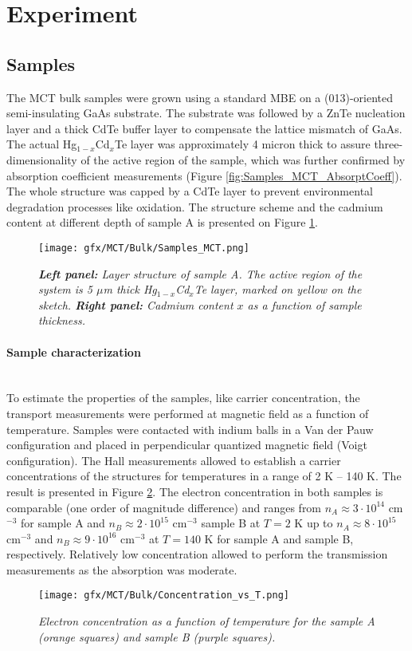 \documentclass[titlepage,a4paper]{book}
\newcommand{\wciecie}{\quad\phantom{v}}
\newcommand{\myparagraph}[1]{\paragraph{#1}\mbox{}\\}
\begin{document}
\section{Experiment}
\subsection{Samples}
\wciecie
The MCT bulk samples were grown using a standard MBE on a (013)-oriented semi-insulating GaAs substrate. The substrate was followed by a ZnTe nucleation layer and a thick CdTe buffer layer to compensate the lattice mismatch of GaAs. The actual Hg$_{1-x}$Cd$_x$Te layer was approximately 4 micron thick to assure three-dimensionality of the active region of the sample, which was further confirmed by absorption coefficient measurements (Figure \ref{fig:Samples_MCT_AbsorptCoeff}). The whole structure was capped by a CdTe layer to prevent environmental degradation processes like oxidation. The structure scheme and the cadmium content at different depth of sample A is presented on Figure \ref{fig:Samples_MCT}. 

\begin{figure}[ht]
	\centering
	\texttt{[image: gfx/MCT/Bulk/Samples\_MCT.png]}
	\vspace{-10pt}
	\caption{\textit{\textbf{Left panel:} Layer structure of sample A. The active region of the system is 5 $\mu$m thick Hg$_{1-x}$Cd$_x$Te layer, marked on yellow on the sketch. \textbf{Right panel:} Cadmium content $x$ as a function of sample thickness.}}
	\label{fig:Samples_MCT}
\end{figure} 

\myparagraph{Sample characterization}
\wciecie
To estimate the properties of the samples, like carrier concentration, the transport measurements were performed at magnetic field as a function of temperature. Samples were contacted with indium balls in a Van der Pauw configuration and placed in perpendicular quantized magnetic field (Voigt configuration). The Hall measurements allowed to establish a carrier concentrations of the structures for temperatures in a range of 2 K -- 140 K. The result is presented in Figure \ref{fig:Samples_MCT_Transport}. The electron concentration in both samples is comparable (one order of magnitude difference) and ranges from $n_A \approx 3 \cdot 10^{14}$ cm$^{-3}$ for sample A and $n_B \approx 2 \cdot 10^{15}$ cm$^{-3}$ sample B at $T = 2$ K up to $n_A \approx 8 \cdot 10^{15}$ cm$^{-3}$ and $n_B \approx 9 \cdot 10^{16}$ cm$^{-3}$ at $T = 140$ K for sample A and sample B, respectively. Relatively low concentration allowed to perform the transmission measurements as the absorption was moderate.
\begin{figure}[ht]
	\centering
	\texttt{[image: gfx/MCT/Bulk/Concentration\_vs\_T.png]}
	\vspace{-10pt}
	\caption{\textit{Electron concentration as a function of temperature for the sample A (orange squares) and sample B (purple squares).}}
	\label{fig:Samples_MCT_Transport}
\end{figure} 
\end{document}
